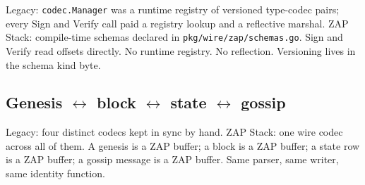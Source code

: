 Legacy: \texttt{codec.Manager} was a runtime registry of versioned
type-codec pairs; every Sign and Verify call paid a registry lookup
and a reflective marshal.
ZAP Stack: compile-time schemas declared in
\texttt{pkg/wire/zap/schemas.go}. Sign and Verify read offsets
directly. No runtime registry. No reflection. Versioning lives in the
schema kind byte.

\subsection{Genesis $\leftrightarrow$ block $\leftrightarrow$ state $\leftrightarrow$ gossip}

Legacy: four distinct codecs kept in sync by hand.
ZAP Stack: one wire codec across all of them. A genesis is a ZAP
buffer; a block is a ZAP buffer; a state row is a ZAP buffer; a
gossip message is a ZAP buffer. Same parser, same writer, same
identity function.
